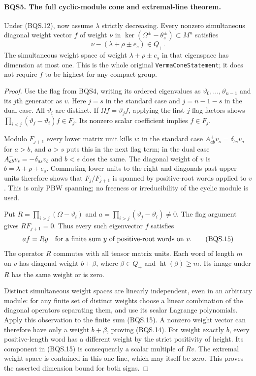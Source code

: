 \paragraph{BQS5. The full cyclic-module cone and extremal-line theorem.}
\label{claim:BQS5}
Under (BQS.12), now assume $\lambda$ strictly decreasing.  Every
nonzero simultaneous diagonal weight vector $f$ of weight $\nu$ in
$\ker(\Omega^\pm-\theta_s^\pm)\subset M^n$ satisfies
\[
              \nu-(\lambda+\rho\pm e_s)\in Q_+.
 \tag{BQS.14}
\]
The simultaneous weight space of weight $\lambda+\rho\pm e_s$ in
that eigenspace has dimension at most one.  This is the whole original
\texttt{VermaConeStatement}; it does not require $f$ to be highest
for any compact group.

\begin{proof}
Use the flag from BQS4, writing its ordered eigenvalues as
$\vartheta_0,\ldots,\vartheta_{n-1}$ and its $j$th generator as $v$.
Here $j=s$ in the standard case and $j=n-1-s$ in the dual case.
All $\vartheta_i$ are distinct.  If $\Omega f=\vartheta_j f$,
applying the first $j$ flag factors shows
$\prod_{i<j}(\vartheta_j-\vartheta_i)f\in F_j$.
Its nonzero scalar coefficient implies $f\in F_j$.

Modulo $F_{j+1}$ every lower matrix unit kills $v$:
in the standard case $A^+_{ab}v_s=\delta_{bs}v_a$ for $a>b$,
and $a>s$ puts this in the next flag term; in the dual case
$A^-_{ab}v_s=-\delta_{as}v_b$ and $b<s$ does the same.
The diagonal weight of $v$ is $b=\lambda+\rho\pm e_s$.
Commuting lower units to the right and diagonals past upper units
therefore shows that $F_j/F_{j+1}$ is spanned by positive-root
words applied to $v$.  This is only PBW spanning; no freeness or
irreducibility of the cyclic module is used.

Put $R=\prod_{i>j}(\Omega-\vartheta_i)$ and
$a=\prod_{i>j}(\vartheta_j-\vartheta_i)\ne0$.
The flag argument gives $R F_{j+1}=0$.  Thus every such eigenvector
$f$ satisfies
\[
           a f=R y
 \quad\hbox{for a finite sum $y$ of positive-root words on $v$}.
 \tag{BQS.15}
\]
The operator $R$ commutes with all tensor matrix units.  Each word of
length $m$ on $v$ has diagonal weight $b+\beta$, where
$\beta\in Q_+$ and $\operatorname{ht}(\beta)\ge m$.
Its image under $R$ has the same weight or is zero.

Distinct simultaneous weight spaces are linearly independent, even in
an arbitrary module: for any finite set of distinct weights choose a
linear combination of the diagonal operators separating them, and use
its scalar Lagrange polynomials.  Apply this observation to the finite
sum (BQS.15).  A nonzero weight vector can therefore have only a weight
$b+\beta$, proving (BQS.14).
For weight exactly $b$, every positive-length word has a different
weight by the strict positivity of height.  Its component in (BQS.15)
is consequently a scalar multiple of $Rv$.
The extremal weight space is contained in this one line, which may
itself be zero.  This proves the asserted dimension bound for both signs.
\end{proof}

